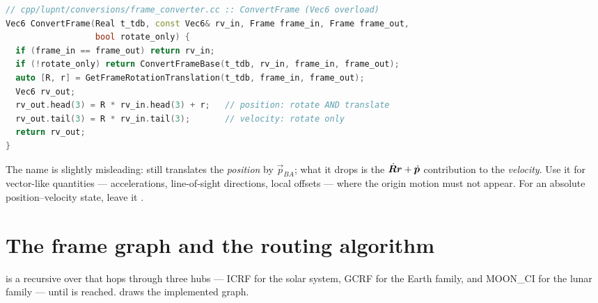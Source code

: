 \begin{lstlisting}[language=cpp, caption={The \texttt{rotate\_only} branch
  (\texttt{cpp/lupnt/conversions/frame\_converter.cc}).},
  label={lst:fc-rotate-only}]
// cpp/lupnt/conversions/frame_converter.cc :: ConvertFrame (Vec6 overload)
Vec6 ConvertFrame(Real t_tdb, const Vec6& rv_in, Frame frame_in, Frame frame_out,
                  bool rotate_only) {
  if (frame_in == frame_out) return rv_in;
  if (!rotate_only) return ConvertFrameBase(t_tdb, rv_in, frame_in, frame_out);
  auto [R, r] = GetFrameRotationTranslation(t_tdb, frame_in, frame_out);
  Vec6 rv_out;
  rv_out.head(3) = R * rv_in.head(3) + r;   // position: rotate AND translate
  rv_out.tail(3) = R * rv_in.tail(3);       // velocity: rotate only
  return rv_out;
}
\end{lstlisting}

\begin{lupntnote}
  The name is slightly misleading:  still translates the
  \emph{position} by $\vec{p}_{BA}$; what it drops is the
  $\dot{\bm{R}}\bm{r} + \dot{\bm{p}}$ contribution to the
  \emph{velocity}. Use it for vector-like quantities --- accelerations,
  line-of-sight directions, local offsets --- where the origin motion must
  not appear. For an absolute position--velocity state, leave it .
\end{lupntnote}

\section{The frame graph and the routing algorithm}
\label{sec:fc-graph}

 is a recursive  over 
that hops through three hubs --- ICRF for the solar system, GCRF for the
Earth family, and MOON\_CI for the lunar family --- until 
is reached.  draws the implemented graph.

